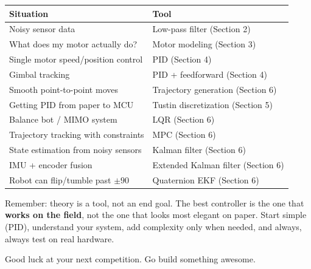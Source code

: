 \begin{center}
\begin{tabular}{ll}
\toprule
\textbf{Situation} & \textbf{Tool} \\
\midrule
Noisy sensor data & Low-pass filter (Section 2) \\
What does my motor actually do? & Motor modeling (Section 3) \\
Single motor speed/position control & PID (Section 4) \\
Gimbal tracking & PID + feedforward (Section 4) \\
Smooth point-to-point moves & Trajectory generation (Section 6) \\
Getting PID from paper to MCU & Tustin discretization (Section 5) \\
Balance bot / MIMO system & LQR (Section 6) \\
Trajectory tracking with constraints & MPC (Section 6) \\
State estimation from noisy sensors & Kalman filter (Section 6) \\
IMU + encoder fusion & Extended Kalman filter (Section 6) \\
Robot can flip/tumble past $\pm 90$\textdegree{} & Quaternion EKF (Section 6) \\
\bottomrule
\end{tabular}
\end{center}

Remember: theory is a tool, not an end goal. The best controller is the one that \textbf{works on the field}, not the one that looks most elegant on paper. Start simple (PID), understand your system, add complexity only when needed, and always, always test on real hardware.

Good luck at your next competition. Go build something awesome.


